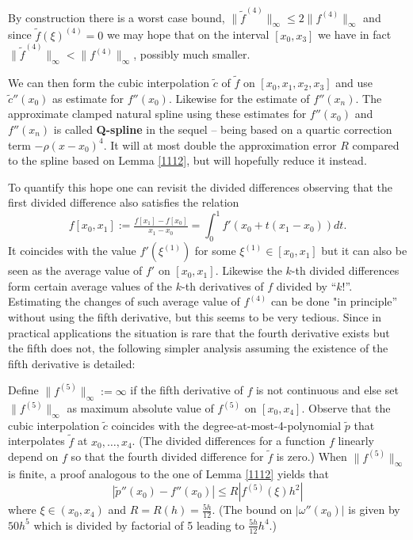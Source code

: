 \documentclass[12pt]{article}
\begin{document}
By construction there is a worst case bound,
$\|\tilde f^{(4)}\|_\infty\le 2\|f^{(4)}\|_\infty$ and since
$\tilde f(\xi)^{(4)}=0$ we may hope that on the interval $[x_0,x_3]$
we have in fact $\|\tilde f^{(4)}\|_\infty < \|f^{(4)}\|_\infty$,
possibly much smaller.

We can then form the cubic interpolation $\tilde c$ of $\tilde f$
on $[x_0,x_1,x_2,x_3]$ and use $\tilde c''(x_0)$ as estimate for
$f''(x_0)$. Likewise for the estimate of $f''(x_n)$.
The approximate  clamped natural spline using these estimates
for $f''(x_0)$ and  $f''(x_n)$ is called   {\bf Q-spline} in the sequel
-- being based on a quartic correction term $-\rho(x-x_0)^4$.
%
It will at most double  the approximation error $R$
compared to the spline
based on Lemma \ref{1112}, 
but will hopefully reduce it instead.

To quantify this hope one can revisit the divided differences observing that
the first divided difference also satisfies the relation
$$
f[x_0,x_1]:=\tfrac{f[x_1]-f[x_0]}{x_1-x_0}=\int_0^1 f'(x_0+t(x_1-x_0))dt.
$$
It coincides with the value $f'(\xi^{(1)})$ for some $\xi^{(1)}\in [x_0,x_1]$
but it can also be seen as the average value of $f'$ on $ [x_0,x_1]$.
Likewise the $k$-th divided differences form certain average values of
the $k$-th derivatives of $f$ divided by ``$k!$''. 
Estimating the changes of such average value of $f^{(4)}$ can be done "in principle'' without using
the fifth derivative, but this seems to be very tedious.
Since in practical applications the situation is rare that the fourth derivative exists
but the fifth does not, the following simpler analysis assuming the existence of the
fifth derivative is detailed:


Define $\|f^{(5)}\|_\infty:=\infty$ if the fifth derivative
of $f$ is not continuous and else set $\|f^{(5)}\|_\infty$ as maximum absolute value of
$f^{(5)}$ on $[x_0,x_4]$.
Observe that the cubic interpolation $\tilde c$ coincides with
the degree-at-most-4-polynomial $\tilde p$ that
interpolates $\tilde f$ at $x_0,\ldots,x_4$.
(The divided differences for a function $f$ linearly depend on $f$ so that the
fourth divided difference for $\tilde f$ is zero.)
When $\|f^{(5)}\|_\infty$ is finite, 
a proof analogous to the one of Lemma \ref{1112} yields
that 
$$
|\tilde p''(x_0)-f''(x_0)| 
\le R \left|f^{(5)}(\xi)h^2\right|
$$
where $\xi\in(x_0,x_4)$ and $R=R(h) = \tfrac{5h}{12}$.
(The bound on $|\omega''(x_0)|$ is given by $50h^5$ which is divided
by factorial of 5 leading to $\tfrac{5h}{12}h^4$.)
\end{document}
